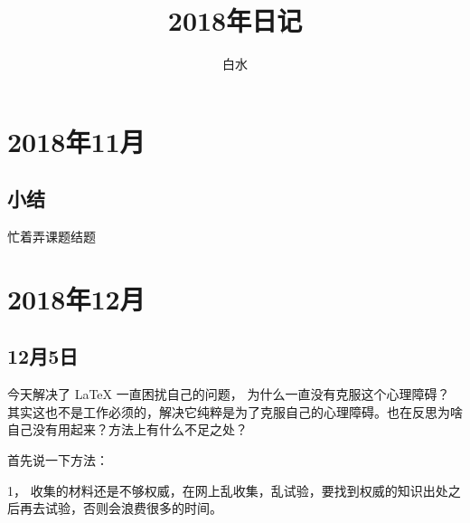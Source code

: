 \documentclass{ctexbook}
\begin{document}
 
	\title{2018年日记} 
	\author{白水}
\maketitle \tableofcontents 
\chapter{2018年11月}
\section{小结}
忙着弄课题结题

\chapter{2018年12月} 
\section{12月5日}
今天解决了 \LaTeX{} 一直困扰自己的问题， 为什么一直没有克服这个心理障碍？ 其实这也不是工作必须的，解决它纯粹是为了克服自己的心理障碍。也在反思为啥自己没有用起来？方法上有什么不足之处？

首先说一下方法：

1， 收集的材料还是不够权威，在网上乱收集，乱试验，要找到权威的知识出处之后再去试验，否则会浪费很多的时间。
\end{document}
